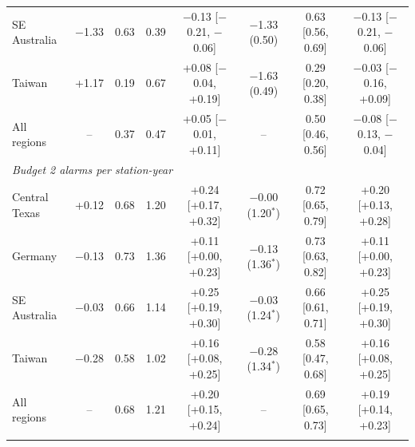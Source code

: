 \begin{table}[tbp]
\begin{tabular*}{\textwidth}{@{\extracolsep\fill}lccccccc}
SE Australia & $-$1.33 & 0.63 & 0.39 & $-$0.13 [$-$0.21, $-$0.06] & $-$1.33 (0.50) & 0.63 [0.56, 0.69] & $-$0.13 [$-$0.21, $-$0.06] \\
Taiwan & +1.17 & 0.19 & 0.67 & +0.08 [$-$0.04, +0.19] & $-$1.63 (0.49) & 0.29 [0.20, 0.38] & $-$0.03 [$-$0.16, +0.09] \\
All regions & -- & 0.37 & 0.47 & +0.05 [$-$0.01, +0.11] & -- & 0.50 [0.46, 0.56] & $-$0.08 [$-$0.13, $-$0.04] \\
\midrule
\multicolumn{8}{l}{\textit{Budget 2 alarms per station-year}}\\
Central Texas & +0.12 & 0.68 & 1.20 & +0.24 [+0.17, +0.32] & $-$0.00 (1.20$^{\ast}$) & 0.72 [0.65, 0.79] & +0.20 [+0.13, +0.28] \\
Germany & $-$0.13 & 0.73 & 1.36 & +0.11 [+0.00, +0.23] & $-$0.13 (1.36$^{\ast}$) & 0.73 [0.63, 0.82] & +0.11 [+0.00, +0.23] \\
SE Australia & $-$0.03 & 0.66 & 1.14 & +0.25 [+0.19, +0.30] & $-$0.03 (1.24$^{\ast}$) & 0.66 [0.61, 0.71] & +0.25 [+0.19, +0.30] \\
Taiwan & $-$0.28 & 0.58 & 1.02 & +0.16 [+0.08, +0.25] & $-$0.28 (1.34$^{\ast}$) & 0.58 [0.47, 0.68] & +0.16 [+0.08, +0.25] \\
All regions & -- & 0.68 & 1.21 & +0.20 [+0.15, +0.24] & -- & 0.69 [0.65, 0.73] & +0.19 [+0.14, +0.23] \\
\botrule
\end{tabular*}
\end{table}
